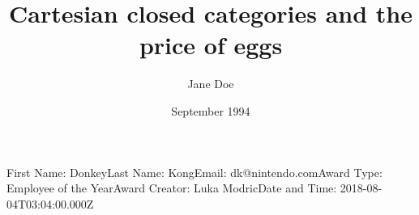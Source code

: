 \documentclass{article}
\title{Cartesian closed categories and the price of eggs}
\author{Jane Doe}
\date{September 1994}
\begin{document}
            \maketitle
        \noindent First Name: Donkey\newline Last Name: Kong\newline Email: dk@nintendo.com\newline Award Type: Employee of the Year\newline Award Creator: Luka Modric\newline Date and Time: 2018-08-04T03:04:00.000Z
            
\end{document}
